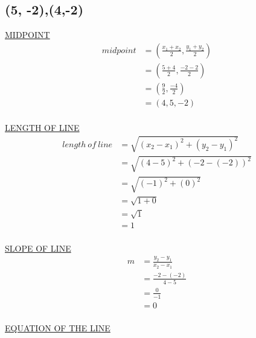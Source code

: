 \documentclass{article}
\begin{document}
\begin{description}
        \subsection{(5, -2),(4,-2)}
        \underline{MIDPOINT}
        $$
            \begin{aligned}
                midpoint & = (\frac{x_1+x_2}{2}, \frac{y_1+y_2}{2}) \\
                         & = (\frac{5+4}{2}, \frac{-2-2}{2})        \\
                         & = (\frac{9}{2}, \frac{-4}{2})            \\
                         & = (4,5, -2)                              \\
            \end{aligned}
        $$

        \underline{LENGTH OF LINE}
        $$
            \begin{aligned}
                length \ of \ line & = \sqrt{(x_2-x_1)^2 + (y_2-y_1)^2} \\
                                   & = \sqrt{(4-5)^2 + (-2-(-2))^2}     \\
                                   & = \sqrt{(-1)^2 + (0)^2}            \\
                                   & = \sqrt{1+0}                       \\
                                   & = \sqrt{1}                         \\
                                   & = 1                                \\
            \end{aligned}
        $$

        \underline{SLOPE OF LINE}
        $$
            \begin{aligned}
                m & = \frac{y_2-y_1}{x_2-x_1} \\
                  & = \frac{-2-(-2)}{4-5}     \\
                  & = \frac{0}{-1}            \\
                  & = 0                       \\
            \end{aligned}
        $$

        \underline{EQUATION OF THE LINE}


\end{description}
\end{document}
